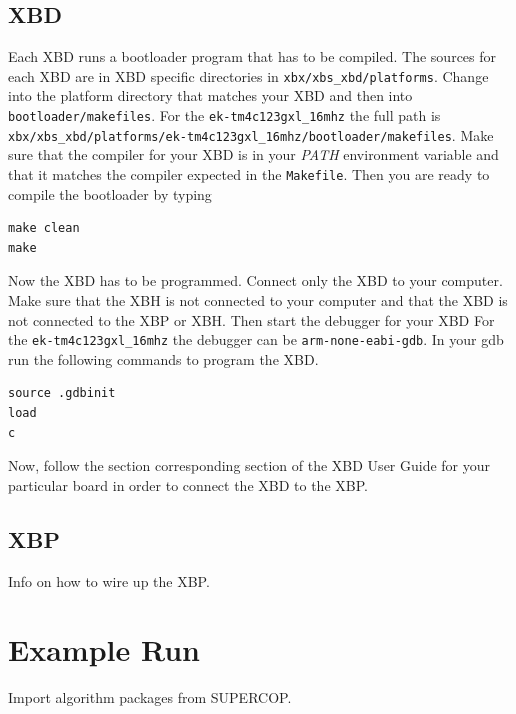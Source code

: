 \documentclass[twoside,11pt]{cergdoc}
\begin{document}
\subsection{XBD}
Each XBD runs a bootloader program that has to be compiled. The sources for each XBD
are in XBD specific directories in 
\verb|xbx/xbs_xbd/platforms|.
Change into the platform directory that matches your XBD and then into 
\texttt{bootloader/makefiles}. For the \verb|ek-tm4c123gxl_16mhz| the full path is
\verb|xbx/xbs_xbd/platforms/ek-tm4c123gxl_16mhz/bootloader/makefiles|.
Make sure that the compiler for your XBD is in your \emph{PATH} environment
variable and that it matches the compiler expected in the \texttt{Makefile}.
Then you are ready to compile the bootloader by typing

\begin{lstlisting}
make clean
make
\end{lstlisting}

%

Now the XBD has to be programmed. Connect only the XBD to your computer.
Make sure that the XBH is not connected to your computer and that the XBD is not
connected to the XBP or XBH. Then start the debugger for your XBD
For the \verb|ek-tm4c123gxl_16mhz| the debugger can be \texttt{arm-none-eabi-gdb}.
In your gdb run the following commands to program the XBD.

\begin{lstlisting}
source .gdbinit
load
c
\end{lstlisting}

Now, follow the section corresponding section of the XBD User Guide for your particular board
in order to connect the XBD to the XBP.

  \subsection{XBP}
Info on how to wire up the XBP.

  \section{Example Run}
Import algorithm packages from SUPERCOP.
\end{document}
